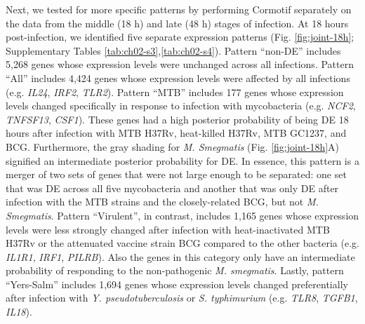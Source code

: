 Next, we tested for more specific patterns by performing Cormotif
separately on the data from the middle (18 h) and late (48 h) stages
of infection. At 18 hours post-infection, we identified five separate
expression patterns (Fig. \ref{fig:joint-18h}; Supplementary Tables
\ref{tab:ch02-s3},\ref{tab:ch02-s4}). Pattern ``non-DE'' includes
5,268 genes whose expression levels were unchanged across all
infections. Pattern ``All'' includes 4,424 genes whose expression
levels were affected by all infections (e.g. \emph{IL24}, \emph{IRF2},
\emph{TLR2}). Pattern ``MTB'' includes 177 genes whose expression
levels changed specifically in response to infection with mycobacteria
(e.g. \emph{NCF2}, \emph{TNFSF13}, \emph{CSF1}). These genes had a
high posterior probability of being DE 18 hours after infection with
MTB H37Rv, heat-killed H37Rv, MTB GC1237, and BCG.  Furthermore, the
gray shading for \emph{M. Smegmatis} (Fig. \ref{fig:joint-18h}A)
signified an intermediate posterior probability for DE. In essence,
this pattern is a merger of two sets of genes that were not large
enough to be separated: one set that was DE across all five
mycobacteria and another that was only DE after infection with the MTB
strains and the closely-related BCG, but not
\emph{M. Smegmatis}. Pattern ``Virulent'', in contrast, includes 1,165
genes whose expression levels were less strongly changed after
infection with heat-inactivated MTB H37Rv or the attenuated vaccine
strain BCG compared to the other bacteria (e.g.  \emph{IL1R1},
\emph{IRF1}, \emph{PILRB}). Also the genes in this category only have
an intermediate probability of responding to the non-pathogenic
\emph{M. smegmatis}. Lastly, pattern ``Yers-Salm'' includes 1,694
genes whose expression levels changed preferentially after infection
with \emph{Y. pseudotuberculosis} or \emph{S.  typhimurium}
(e.g. \emph{TLR8}, \emph{TGFB1}, \emph{IL18}).

